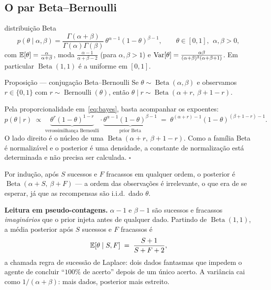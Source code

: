 \documentclass[11pt, a4paper]{article}
\newcommand{\Bdist}{\operatorname{Beta}}
\newcommand{\Bern}{\operatorname{Bernoulli}}
\begin{document}
\subsection*{O par Beta--Bernoulli}

\begin{defbox}{distribuição Beta}
\[
  p(\theta \mid \alpha,\beta)
  = \frac{\Gamma(\alpha+\beta)}{\Gamma(\alpha)\Gamma(\beta)}\,
    \theta^{\alpha-1}(1-\theta)^{\beta-1},
  \qquad \theta \in [0,1],\ \ \alpha,\beta>0,
\]
com $\mathbb{E}[\theta] = \frac{\alpha}{\alpha+\beta}$, moda
$\frac{\alpha-1}{\alpha+\beta-2}$ (para $\alpha,\beta>1$) e
$\operatorname{Var}[\theta] = \frac{\alpha\beta}{(\alpha+\beta)^2(\alpha+\beta+1)}$.
Em particular $\Bdist(1,1)$ é a uniforme em $[0,1]$.
\end{defbox}

\begin{teobox}{Proposição — conjugação Beta--Bernoulli}
Se $\theta \sim \Bdist(\alpha,\beta)$ e observamos $r \in \{0,1\}$ com
$r \sim \Bern(\theta)$, então $\theta \mid r \sim \Bdist(\alpha+r,\ \beta+1-r)$.
\end{teobox}

\begin{provabox}
Pela proporcionalidade em~\eqref{eq:bayes}, basta acompanhar os expoentes:
\[
  p(\theta\mid r)
  \;\propto\;
  \underbrace{\theta^{r}(1-\theta)^{1-r}}_{\text{verossimilhança }\Bern}
  \cdot
  \underbrace{\theta^{\alpha-1}(1-\theta)^{\beta-1}}_{\text{prior }\Bdist}
  \;=\;
  \theta^{(\alpha+r)-1}(1-\theta)^{(\beta+1-r)-1}.
\]
O lado direito é o núcleo de uma $\Bdist(\alpha+r,\ \beta+1-r)$. Como a família
Beta é normalizável e o posterior é uma densidade, a constante de normalização
está determinada e não precisa ser calculada. $\square$

\smallskip
Por indução, após $S$ sucessos e $F$ fracassos em qualquer ordem, o posterior é
$\Bdist(\alpha+S,\ \beta+F)$ — a ordem das observações é irrelevante, o que era
de se esperar, já que as recompensas são i.i.d.\ dado $\theta$.
\end{provabox}

\begin{ideiabox}
\textbf{Leitura em pseudo-contagens.} $\alpha-1$ e $\beta-1$ são sucessos e
fracassos \emph{imaginários} que o prior injeta antes de qualquer dado.
Partindo de $\Bdist(1,1)$, a média posterior após $S$ sucessos e $F$ fracassos é
\[
  \mathbb{E}[\theta \mid S,F] \;=\; \frac{S+1}{S+F+2},
\]
a chamada regra de sucessão de Laplace: dois dados fantasmas que impedem o
agente de concluir ``$100\%$ de acerto'' depois de um único acerto. A variância
cai como $1/(\alpha+\beta)$: mais dados, posterior mais estreito.
\end{ideiabox}
\end{document}
